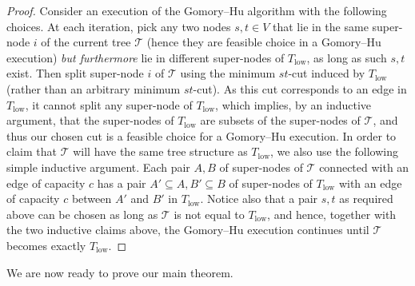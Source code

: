 \documentclass[11pt]{article}
\numberwithin{equation}{section}
\theoremstyle{definition}
\theoremstyle{plain}
\theoremstyle{plain}
\newcommand{\T}{\mathcal{T}}
\begin{document}
\begin{proof}
  Consider an execution of the Gomory--Hu algorithm with the following choices.
  At each iteration, pick any two nodes $s,t\in V$
  that lie in the same super-node $i$ of the current tree $\T$
  (hence they are feasible choice in a Gomory--Hu execution)
  \emph{but furthermore} lie in different super-nodes of $T_{\mathrm{low}}$,
  as long as such $s,t$ exist.
  Then split super-node $i$ of $\T$ using the minimum $st$-cut induced by $T_{\mathrm{low}}$ (rather than an arbitrary minimum $st$-cut).
  As this cut corresponds to an edge in $T_{\mathrm{low}}$,
  it cannot split any super-node of $T_{\mathrm{low}}$,
  which implies, by an inductive argument,
  that the super-nodes of $T_{\mathrm{low}}$ are subsets of the super-nodes of $\T$,
  and thus our chosen cut is a feasible choice for a Gomory--Hu execution.
In order to claim that $\T$ will have the same tree structure as $T_{\mathrm{low}}$, we also use the following simple inductive argument.
Each pair $A,B$ of super-nodes of $\T$ connected with an edge of capacity $c$ has a pair $A'\subseteq A, B'\subseteq B$ of super-nodes of $T_{\mathrm{low}}$ with an edge of capacity $c$
%
between
$A'$ and $B'$ in $T_{\mathrm{low}}$.
  Notice also that a pair $s,t$ as required above can be chosen
  as long as $\T$ is not equal to $T_{\mathrm{low}}$, and hence, together with the two inductive claims above,
  the Gomory--Hu execution continues until $\T$ becomes exactly $T_{\mathrm{low}}$.
\end{proof}


\medskip
We are now ready to prove our main theorem.
\end{document}

